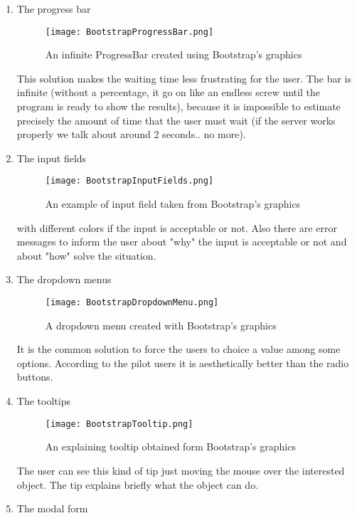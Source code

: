 \begin{enumerate}
\item The progress bar

\begin{figure}[H]
\centering
\texttt{[image: BootstrapProgressBar.png]} 
\caption{An infinite ProgressBar created using Bootstrap's graphics}
\end{figure}

This solution makes the waiting time less frustrating for the user. The bar is infinite (without a percentage, it go on like an endless screw until the program is ready to show the results), because it is impossible to estimate precisely the amount of time that the user must wait (if the server works properly we talk about around 2 seconds.. no more).

\item The input fields

\begin{figure}[H]
\centering
\texttt{[image: BootstrapInputFields.png]} 
\caption{An example of input field taken from Bootstrap's graphics}
\end{figure}

with different colors if the input is acceptable or not. Also there are error messages to inform the user about "why" the input is acceptable or not and about "how" solve the situation.


\item The dropdown menus

\begin{figure}[H]
\centering
\texttt{[image: BootstrapDropdownMenu.png]} 
\caption{A dropdown menu created with Bootstrap's graphics}
\end{figure}

It is the common solution to force the users to choice a value among some options. According to the pilot users it is aesthetically better than the radio buttons.

\item The tooltips

\begin{figure}[H]
\centering
\texttt{[image: BootstrapTooltip.png]} 
\caption{An explaining tooltip obtained form Bootstrap's graphics}
\end{figure}

The user can see this kind of tip just moving the mouse over the interested object. The tip explains briefly what the object can do.

\item The modal form


\end{enumerate}
